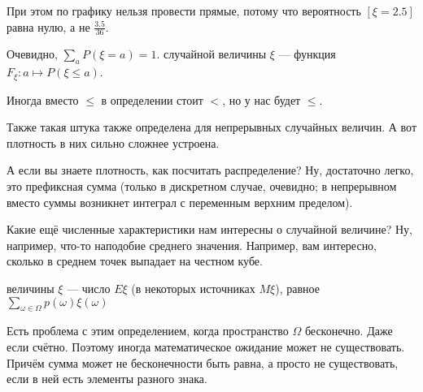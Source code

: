 \documentclass{article}
\begin{document}
\begin{itemize}
\begin{Example}
\begin{center}
            \end{center}
            При этом по графику нельзя провести прямые, потому что вероятность $[\xi=2.5]$ равна нулю, а не $\frac{3.5}{36}$.
        \end{Example}
        \thm Очевидно, $\sum\limits_{a}P(\xi=a)=1$.
        \dfn {} случайной величины $\xi$ --- функция $F_\xi\colon a\mapsto P(\xi\leqslant a)$.
        \begin{Comment}
            Иногда вместо $\leqslant$ в определении стоит $<$, но у нас будет $\leqslant$.
        \end{Comment}
        \begin{Comment}
            Также такая штука также определена для непрерывных случайных величин. А вот плотность в них сильно сложнее устроена.
        \end{Comment}
        \begin{Comment}
            А если вы знаете плотность, как посчитать распределение? Ну, достаточно легко, это префиксная сумма (только в дискретном случае, очевидно; в непрерывном вместо суммы возникнет интеграл с переменным верхним пределом).
        \end{Comment}
        \begin{Comment}
            Какие ещё численные характеристики нам интересны о случайной величине? Ну, например, что-то наподобие среднего значения. Например, вам интересно, сколько в среднем точек выпадает на честном кубе.
        \end{Comment}
        \dfn {} величины $\xi$ --- число $E\xi$ (в некоторых источниках $M\xi$), равное $\sum\limits_{\omega\in\Omega}p(\omega)\xi(\omega)$
        \begin{Comment}
            Есть проблема с этим определением, когда пространство $\Omega$ бесконечно. Даже если счётно. Поэтому иногда математическое ожидание может не существовать. Причём сумма может не бесконечности быть равна, а просто не существовать, если в ней есть элементы разного знака.

\end{Comment}
\end{itemize}
\end{document}
